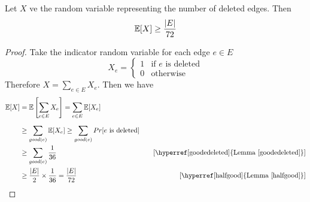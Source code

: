 \begin{lemma}
	Let $X$ ve the random variable representing the number of deleted edges. Then $$\mathbb{E}[X]\geq \frac{|E|}{72}$$
\end{lemma}
\begin{proof}
	Take the indicator random variable for each edge $e\in E$ $$X_e=\begin{cases}
		1& \text{if $e$ is deleted}\\ 0 &\text{otherwise}
	\end{cases}$$
	Therefore $X=\sum\limits_{e\in E}X_e$. Then we have \begin{align*}
		\bbE[X] & = \bbE\lt[ \sum_{e\in E}X_e \rt] = \sum_{e\in E}\bbE[X_e]\\[2mm]
		& \geq \sum_{good(e)}\bbE[X_e]\geq \sum_{good(e)}Pr[\text{$e$ is deleted}]\\ 
		& \geq \sum_{good(e)}\frac1{36} &\quad [\text{\hyperref[goodedeleted]{Lemma \ref{goodedeleted}}}]\\
		& \geq \frac{|E|}{2}\times \frac1{36}=\frac{|E|}{72}&\quad [\text{\hyperref[halfgood]{Lemma \ref{halfgood}}}]
	\end{align*}
\end{proof}